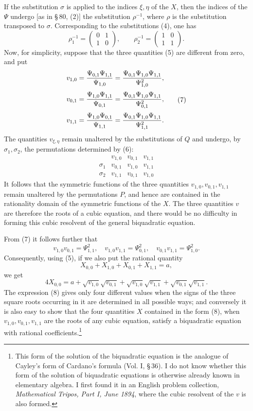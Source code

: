 \documentclass[11pt]{article}
\providecommand{\mat}[4]{\begin{pmatrix}#1&#2\\#3&#4\end{pmatrix}}
\providecommand{\mat}[4]{\begin{pmatrix}#1&#2\\#3&#4\end{pmatrix}}
\providecommand{\mat}[1]{\begin{pmatrix}#1\end{pmatrix}}
\begin{document}
If the substitution $\sigma$ is applied to the indices $\xi,\eta$ of the $X$, then the indices of the $\Psi$ undergo [as in \S\,80, (2)] the substitution $\rho^{-1}$, where $\rho$ is the substitution transposed to $\sigma$. Corresponding to the substitutions (4), one has
\begin{equation}
 \rho_1^{-1}=\mat{0}{1}{1}{0},
 \qquad
 \rho_2^{-1}=\mat{1}{0}{1}{1}.
 \tag{6}
\end{equation}
Now, for simplicity, suppose that the three quantities (5) are different from zero, and put
\begin{equation}
\begin{aligned}
 v_{1,0}&={\Psi_{0,1}\Psi_{1,1}\over\Psi_{1,0}}={\Psi_{0,1}\Psi_{1,0}\Psi_{1,1}\over\Psi_{1,0}^2},\\[0.25em]
 v_{0,1}&={\Psi_{1,0}\Psi_{1,1}\over\Psi_{0,1}}={\Psi_{0,1}\Psi_{1,0}\Psi_{1,1}\over\Psi_{0,1}^2},\\[0.25em]
 v_{1,1}&={\Psi_{1,0}\Psi_{0,1}\over\Psi_{1,1}}={\Psi_{0,1}\Psi_{1,0}\Psi_{1,1}\over\Psi_{1,1}^2}.
\end{aligned}
\tag{7}
\end{equation}
The quantities $v_{\xi,\eta}$ remain unaltered by the substitutions of $Q$ and undergo, by $\sigma_1,\sigma_2$, the permutations determined by (6):
\[
\begin{array}{c|ccc}
&v_{1,0}&v_{0,1}&v_{1,1}\\
\sigma_1&v_{0,1}&v_{1,0}&v_{1,1}\\
\sigma_2&v_{1,1}&v_{0,1}&v_{1,0}
\end{array}
\]
It follows that the symmetric functions of the three quantities $v_{1,0},v_{0,1},v_{1,1}$ remain unaltered by the permutations $P$, and hence are contained in the rationality domain of the symmetric functions of the $X$. The three quantities $v$ are therefore the roots of a cubic equation, and there would be no difficulty in forming this cubic resolvent of the general biquadratic equation.

From (7) it follows further that
\[
 v_{1,0}v_{0,1}=\Psi_{1,1}^2,
 \quad v_{1,0}v_{1,1}=\Psi_{0,1}^2,
 \quad v_{0,1}v_{1,1}=\Psi_{1,0}^2.
\]
Consequently, using (5), if we also put the rational quantity
\[
 X_{0,0}+X_{1,0}+X_{0,1}+X_{1,1}=a,
\]
we get
\begin{equation}
 4X_{0,0}=a+\sqrt{v_{1,0}}\sqrt{v_{0,1}}
       +\sqrt{v_{1,0}}\sqrt{v_{1,1}}
       +\sqrt{v_{0,1}}\sqrt{v_{1,1}}.
 \tag{8}
\end{equation}
The expression (8) gives only four different values when the signs of the three square roots occurring in it are determined in all possible ways; and conversely it is also easy to show that the four quantities $X$ contained in the form (8), when $v_{1,0},v_{0,1},v_{1,1}$ are the roots of any cubic equation, satisfy a biquadratic equation with rational coefficients.\footnote{This form of the solution of the biquadratic equation is the analogue of Cayley's form of Cardano's formula (Vol. I, \S\,36). I do not know whether this form of the solution of biquadratic equations is otherwise already known in elementary algebra. I first found it in an English problem collection, \emph{Mathematical Tripos, Part I, June 1894}, where the cubic resolvent of the $v$ is also formed.}
\end{document}
